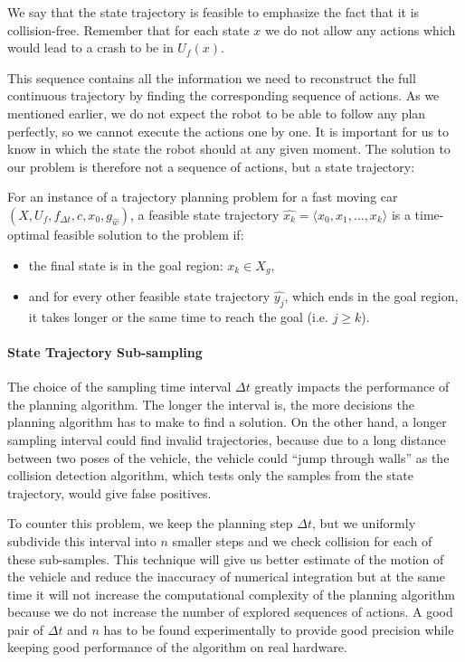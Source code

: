 We say that the state trajectory is feasible to emphasize the fact that it is collision-free. Remember that for each state $x$ we do not allow any actions which would lead to a crash to be in $U_f(x)$.

This sequence contains all the information we need to reconstruct the full continuous trajectory by finding the corresponding sequence of actions. As we mentioned earlier, we do not expect the robot to be able to follow any plan perfectly, so we cannot execute the actions one by one. It is important for us to know in which the state the robot should at any given moment. The solution to our problem is therefore not a sequence of actions, but a state trajectory:

\begin{defn}
	For an instance of a trajectory planning problem for a fast moving car $\left(X, U_f, f_{\Delta t}, c, x_0, g_{\hat{w}}\right)$, a feasible state trajectory $\hat{x_k}=\langle x_0, x_1, \ldots, x_k \rangle$ is a time-optimal feasible solution to the problem if:
	\begin{itemize}
		\item the final state is in the goal region: $x_k \in X_g$,
		\item and for every other feasible state trajectory $\hat{y_j}$, which ends in the goal region, it takes longer or the same time to reach the goal (i.e. $j \geq k$).
	\end{itemize}
\end{defn}

\paragraph{State Trajectory Sub-sampling}

The choice of the sampling time interval $\Delta t$ greatly impacts the performance of the planning algorithm. The longer the interval is, the more decisions the planning algorithm has to make to find a solution. On the other hand, a longer sampling interval could find invalid trajectories, because due to a long distance between two poses of the vehicle, the vehicle could ``jump through walls'' as the collision detection algorithm, which tests only the samples from the state trajectory, would give false positives.

To counter this problem, we keep the planning step $\Delta t$, but we uniformly subdivide this interval into $n$ smaller steps and we check collision for each of these sub-samples. This technique will give us better estimate of the motion of the vehicle and reduce the inaccuracy of numerical integration but at the same time it will not increase the computational complexity of the planning algorithm because we do not increase the number of explored sequences of actions. A good pair of $\Delta t$ and $n$ has to be found experimentally to provide good precision while keeping good performance of the algorithm on real hardware.

